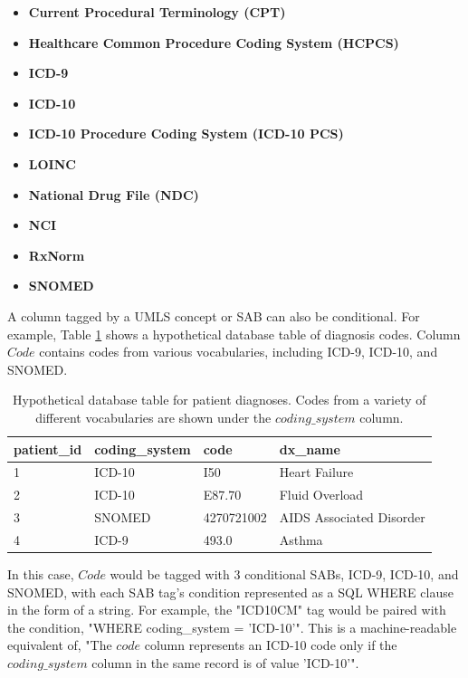 \documentclass[../main.tex]{subfiles}
\begin{document}
\begin{itemize}
    \item \textbf{Current Procedural Terminology (CPT)}
    \item \textbf{Healthcare Common Procedure Coding System (HCPCS)}
    \item \textbf{ICD-9}
    \item \textbf{ICD-10}
    \item \textbf{ICD-10 Procedure Coding System (ICD-10 PCS)}
    \item \textbf{LOINC}
    \item \textbf{National Drug File (NDC)}
    \item \textbf{NCI}
    \item \textbf{RxNorm}
    \item \textbf{SNOMED}
\end{itemize}

A column tagged by a UMLS concept or SAB can also be conditional. For example, Table \ref{tbl_smm_example_data} shows a hypothetical database table of diagnosis codes. Column $Code$ contains codes from various vocabularies, including ICD-9, ICD-10, and SNOMED.

\def\arraystretch{0.8}
\begin{table}[h!]
\centering
\begin{tabular}{l l l l}
 \toprule
 \textbf{patient\_id} & \textbf{coding\_system} & \textbf{code} & \textbf{dx\_name} \\
 \hline
    1 & ICD-10 & I50 & Heart Failure \\
    2 & ICD-10 & E87.70 & Fluid Overload \\
    3 & SNOMED & 4270721002 & AIDS Associated Disorder \\
    4 & ICD-9  & 493.0 & Asthma \\
 \hline
\end{tabular}
\caption{Hypothetical database table for patient diagnoses. Codes from a variety of different vocabularies are shown under the $coding\_system$ column.}
\label{tbl_smm_example_data}
\end{table}

In this case, $Code$ would be tagged with 3 conditional SABs, ICD-9, ICD-10, and SNOMED, with each SAB tag's condition represented as a SQL WHERE clause in the form of a string. For example, the "ICD10CM" tag would be paired with the condition, "WHERE coding\_system = 'ICD-10'". This is a machine-readable equivalent of, "The $code$ column represents an ICD-10 code only if the $coding\_system$ column in the same record is of value 'ICD-10'".
\end{document}
